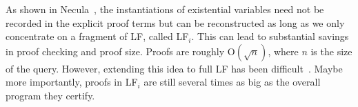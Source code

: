 \documentclass{llncs}
\newcommand{\figfoot}{\vspace{1ex}\hrule}
\newcommand{\fighead}{\hrule\vspace{1.5ex}}
\newcommand{\nil}{\mathsf{nil}}
\newcommand{\vd}{\vdash}
\newcommand{\arrow}{\rightarrow}
\newcommand{\oftp}{\mathord{:}}
\begin{document}

As shown in Necula~\cite{Necula98lics}, the instantiations of
existential variables need not be recorded in the explicit proof terms
but can be reconstructed as long as we only concentrate on a fragment
of LF, called LF$_i$. This can lead to substantial savings in proof
checking and proof size. Proofs are roughly $\mathrm{O}(\sqrt{n})$,
where $n$ is the size of the query. However, extending this idea to
full LF has been difficult~\cite{Reed04lfm}. Maybe more importantly,
proofs in LF$_i$ are still several times as big as the overall program
they certify.
\end{document}

